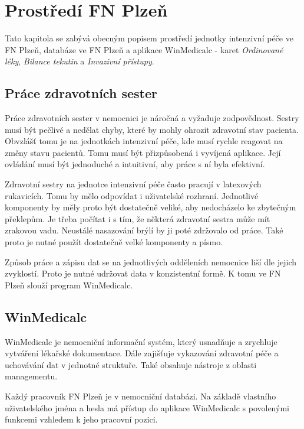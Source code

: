 \setlength{\parskip}{1em}

\chapter{Prostředí FN Plzeň}

Tato kapitola se zabývá obecným popisem prostředí jednotky intenzivní péče ve FN Plzeň, databáze ve FN Plzeň a aplikace WinMedicalc - karet \emph{Ordinované léky}, \emph{Bilance tekutin} a \emph{Invazivní přístupy}.

\section{Práce zdravotních sester}

Práce zdravotních sester v nemocnici je náročná a vyžaduje zodpovědnost. Sestry musí být pečlivé a nedělat chyby, které by mohly ohrozit zdravotní stav pacienta. Obvzlášť tomu je na jednotkách intenzivní péče, kde musí rychle reagovat na změny stavu pacientů. Tomu musí být přizpůsobená i vyvíjená aplikace. Její ovládání musí být jednoduché a intuitivní, aby práce s ní byla efektivní.

Zdravotní sestry na jednotce intenzivní péče často pracují v latexových rukavicích. Tomu by mělo odpovídat i uživatelské rozhraní. Jednotlivé komponenty by měly proto být dostatečně veliké, aby nedocházelo ke zbytečným překlepům. Je třeba počítat i s tím, že některá zdravotní sestra může mít zrakovou vadu. Neustálé nasazování brýlí by ji poté zdržovalo od práce. Také proto je nutné použít dostatečně velké komponenty a písmo.

Způsob práce a zápisu dat se na jednotlivých odděleních nemocnice liší dle jejich zvyklostí. Proto je nutné udržovat data v konzistentní formě. K tomu ve FN Plzeň slouží program WinMedicalc.

\section{WinMedicalc}

WinMedicalc je nemocniční informační systém, který usnadňuje a zrychluje vytváření lékařské dokumentace. Dále zajišťuje vykazování zdravotní péče a uchovávání dat v jednotné struktuře. Také obsahuje nástroje z oblasti managementu.

Každý pracovník FN Plzeň je v nemocniční databázi. Na základě vlastního uživatelského jména a hesla má přístup do aplikace WinMedicalc s povolenými funkcemi vzhledem k jeho pracovní pozici.

